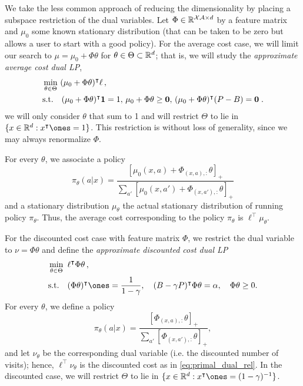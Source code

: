 \documentclass[11pt]{article}
\begin{document}
We take the less common approach of reducing the dimensionality by placing a subspace restriction of the dual variables. Let $\Phi\in\mathbb R^{{\cal X}{\cal A}\times d}$ by a feature matrix and $\mu_0$ some known stationary distribution (that can be taken to be zero but allows a user to start with a good policy). For the average cost case, we will limit our search to $\mu = \mu_0 + \Phi\theta$ for $\theta\in\Theta\subset\mathbb R^d$; that is, we will study the \emph{approximate average cost dual LP},
\begin{align}
\label{eq:dual-apprx}
&\min_{\theta\in\Theta}~ (\mu_0 + \Phi \theta)^\top  \ell\,, \\
\notag
&\mbox{s.t.}\quad (\mu_0+\Phi\theta)^\top  \mathbf 1 = 1,\, \mu_0+ \Phi \theta \geq \mathbf 0,\, (\mu_0+\Phi\theta)^\top (P - B) = \mathbf 0 \; .
\end{align}
we will only consider $\theta$ that sum to 1 and will restrict $\Theta$ to lie in $\{x\in\Reals^d: x^\top\ones = 1\}$. This restriction is without loss of generality, since we may always renormalize $\Phi$. 

For every $\theta$, we associate a policy
\begin{equation}
\label{eq:average_cost_policy}
\pi_{\theta}(a|x) = \frac{[\mu_0(x,a) + \Phi_{(x,a),:} \theta]_{+}}{\sum_{a'} [\mu_0(x,a') + \Phi_{(x,a'),:} \theta]_{+}}
\end{equation}
and a stationary distribution $\mu_\theta$ the actual stationary distribution of running policy $\pi_\theta$. Thus, the average cost corresponding to the policy $\pi_\theta$ is $\ell^\top\mu_\theta$.

For the discounted cost case with feature matrix $\Phi$, we restrict the dual variable to $\nu = \Phi\theta$ and define the \emph{approximate discounted cost dual LP}
\begin{align*}
&\min_{\theta\in\Theta}~ \ell^\top\Phi\theta\,, \\
\notag
&\mbox{s.t.} \quad(\Phi\theta)^\top \ones = \frac{1}{1-\gamma},\quad (B - \gamma P)^\top \Phi\theta  = \alpha,\quad \Phi\theta\geq 0.
\end{align*}
For every $\theta$, we define a policy
\begin{equation}
\label{eq:discounted_cost_policy}
\pi_{\theta}(a|x) = \frac{[\Phi_{(x,a),:} \theta]_{+}}{\sum_{a'} [\Phi_{(x,a'),:} \theta]_{+}},
\end{equation}
and let $\nu_\theta$ be the corresponding dual variable (i.e. the discounted number of visits); hence,  $\ell^\top\nu_\theta$ is the discounted cost as in \eqref{eq:primal_dual_rel}. In the discounted case, we will restrict $\Theta$ to lie in $\{x\in\Reals^d: x^\top\ones = (1-\gamma)^{-1}\}$. 
\end{document}
